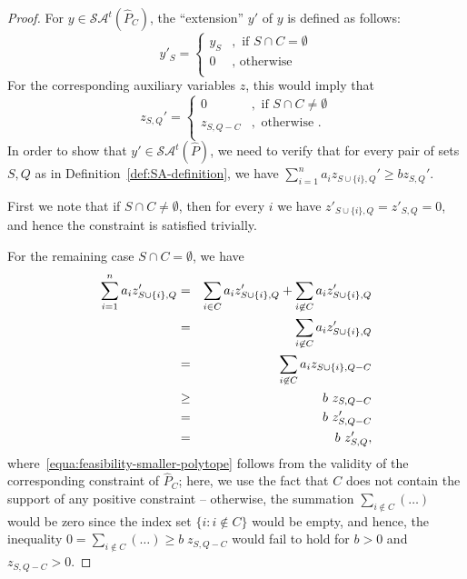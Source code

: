 \documentclass[11pt]{article}
\newcommand\by {{y}}
\newcommand\bz {{z}}
\newcommand{\saop}{\mathcal{SA}}
\begin{document}
\begin{proof}
For $\by \in  \saop^t(\widehat{P}_C)$, the ``extension'' $\by'$ of
$\by$ is defined as follows:
$$
\by'_S = \left\{
\begin{array}{ll}
\by_S &, \textrm{~if~} S\cap C  = \emptyset \\
0  &, \textrm{~otherwise~} \\
\end{array}
\right. $$
For the corresponding auxiliary variables $\bz$, this would imply that
$$
\bz_{S,Q}' = \left\{
\begin{array}{ll}
0  &, \textrm{~if~} S\cap C  \not = \emptyset \\
\bz_{S,Q-C}  &, \textrm{~otherwise~}. \\
\end{array}
\right. $$
In order to show that $\by' \in  \saop^t(\widehat{P})$, we need to
verify that for every pair of sets $S,Q$ as in
Definition~\ref{def:SA-definition}, we have
$\sum_{i=1}^n a_i   z_{S \cup \{i\},Q}' \geq b z_{S,Q}'$.

First we note that if $S \cap C \not = \emptyset$, then for every
$i$ we have $\bz'_{S \cup \{i\},Q} = \bz'_{S ,Q} = 0$, and hence the
constraint is satisfied trivially.

For the remaining case $S \cap C = \emptyset$, we have
\begin{eqnarray}
\sum_{i=1}^n a_i   z_{S \cup \{i\},Q}'
&=&
\sum_{i \in C} a_i   z_{S \cup \{i\},Q}' + \sum_{i \not \in C} a_i   z_{S \cup \{i\},Q}' \notag\\
&=&
\sum_{i \not \in C} a_i   z_{S \cup \{i\},Q}' \notag \\
&=&
\sum_{i \not \in C} a_i   z_{S \cup \{i\},Q-C} \notag \\
&\geq &
b  ~ z_{S,Q-C} \label{equa:feasibility-smaller-polytope} \\
&=&
b  ~ z_{S,Q-C}' \notag \\
&=&
b ~  z_{S,Q}' \notag,
\end{eqnarray}
where~\eqref{equa:feasibility-smaller-polytope} follows from the
validity of the corresponding constraint of $\widehat{P}_C$;
here, we use the fact that $C$ does not contain the support of any
positive constraint -- otherwise, the summation $\sum_{i\not\in{C}}(\dots)$
would be zero since the index set $\{i: i\not\in{C}\}$ would be empty,
and hence, the inequality
$0 = \sum_{i\not\in{C}}(\dots) \geq b\; z_{S,Q-C}$
would fail to hold for $b>0$ and $z_{S,Q-C} > 0$.
\end{proof}
\end{document}
